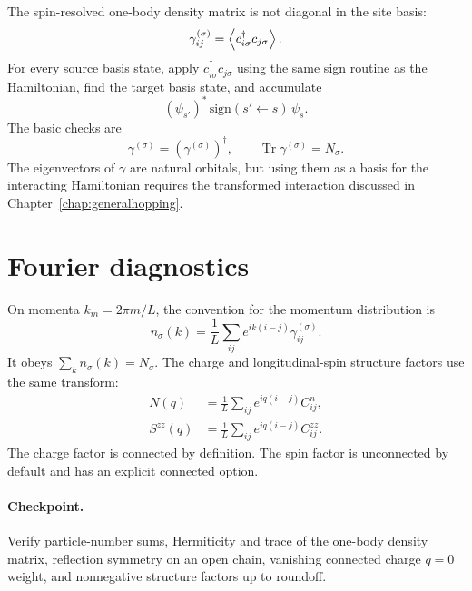 The spin-resolved one-body density matrix is not diagonal in the site basis:
\begin{equation}
\gamma^{(\sigma)}_{ij}
=\left\langle c_{i\sigma}^\dagger c_{j\sigma} \right\rangle.
\label{eq:obdm}
\end{equation}
For every source basis state, apply $c_{i\sigma}^\dagger c_{j\sigma}$ using the
same sign routine as the Hamiltonian, find the target basis state, and
accumulate
\begin{equation}
(\psi_{s'})^*\,\mathrm{sign}(s'\leftarrow s)\,\psi_s.
\end{equation}
The basic checks are
\begin{equation}
\gamma^{(\sigma)}=\left(\gamma^{(\sigma)}\right)^\dagger,
\qquad
\operatorname{Tr}\gamma^{(\sigma)}=N_\sigma.
\end{equation}
The eigenvectors of $\gamma$ are natural orbitals, but using them as a basis
for the interacting Hamiltonian requires the transformed interaction discussed
in Chapter~\ref{chap:generalhopping}.

\section{Fourier diagnostics}

On momenta $k_m=2\pi m/L$, the convention for the momentum distribution is
\begin{equation}
n_\sigma(k)=\frac{1}{L}\sum_{ij}e^{ik(i-j)}
\gamma^{(\sigma)}_{ij}.
\end{equation}
It obeys $\sum_k n_\sigma(k)=N_\sigma$.  The charge and longitudinal-spin
structure factors use the same transform:
\begin{align}
N(q)&=\frac{1}{L}\sum_{ij}e^{iq(i-j)}C^n_{ij},\\
S^{zz}(q)&=\frac{1}{L}\sum_{ij}e^{iq(i-j)}C^{zz}_{ij}.
\end{align}
The charge factor is connected by definition.  The spin factor is unconnected
by default and has an explicit connected option.



\paragraph{Checkpoint.}
Verify particle-number sums, Hermiticity and trace of the one-body density
matrix, reflection symmetry on an open chain, vanishing connected charge
$q=0$ weight, and nonnegative structure factors up to roundoff.
